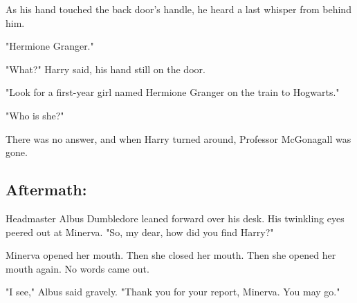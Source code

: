 As his hand touched the back door's handle, he heard a last whisper from behind
him.

"Hermione Granger."

"What?" Harry said, his hand still on the door.

"Look for a first-year girl named Hermione Granger on the train to Hogwarts."

"Who is she?"

There was no answer, and when Harry turned around, Professor McGonagall was
gone.
\sbreak
\vspace{-2\baselineskip}
\subsection{Aftermath:}

Headmaster Albus Dumbledore leaned forward over his desk. His twinkling eyes
peered out at Minerva. "So, my dear, how did you find Harry?"

Minerva opened her mouth. Then she closed her mouth. Then she opened her mouth
again. No words came out.

"I see," Albus said gravely. "Thank you for your report, Minerva. You may go."
